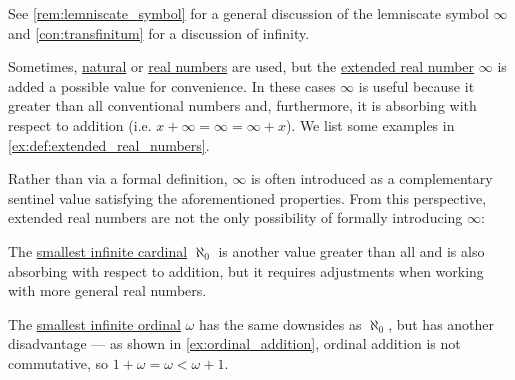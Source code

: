 \begin{comments}
  \item See \cref{rem:lemniscate_symbol} for a general discussion of the lemniscate symbol \( \infty \) and \cref{con:transfinitum} for a discussion of infinity.
\end{comments}

\begin{remark}\label{rem:adjoining_infinity}
  Sometimes, \hyperref[def:natural_numbers]{natural} or \hyperref[def:real_numbers]{real numbers} are used, but the \hyperref[def:extended_real_numbers]{extended real number} \( \infty \) is added a possible value for convenience. In these cases \( \infty \) is useful because it greater than all conventional numbers and, furthermore, it is absorbing with respect to addition (i.e. \( x + \infty = \infty = \infty + x \)). We list some examples in \cref{ex:def:extended_real_numbers}.

  Rather than via a formal definition, \( \infty \) is often introduced as a complementary sentinel value satisfying the aforementioned properties. From this perspective, extended real numbers are not the only possibility of formally introducing \( \infty \):
  \begin{thmenum}
     The \hyperref[def:aleph_hierarchy]{smallest infinite cardinal} \( \aleph_0 \) is another value greater than all  and is also absorbing with respect to addition, but it requires adjustments when working with more general real numbers.

     The \hyperref[thm:omega_is_an_ordinal]{smallest infinite ordinal} \( \omega \) has the same downsides as \( \aleph_0 \), but has another disadvantage --- as shown in \cref{ex:ordinal_addition}, ordinal addition is not commutative, so \( 1 + \omega = \omega < \omega + 1 \).
  \end{thmenum}
\end{remark}


